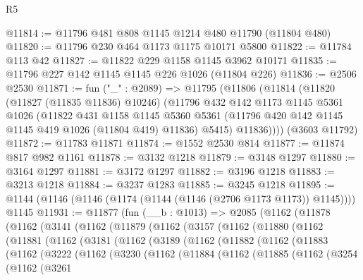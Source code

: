 \begin{lexlean}{R5}
\begin{coremodule}
@11814 := @11796 @481 @808 @1145 @1214 @480 @11790 (@11804 @480)
@11820 := @11796 @230 @464 @1173 @1175 @10171 @5800
@11822 := @11784 @113 @42
@11827 := @11822 @229 @1158 @1145 @3962 @10171
@11835 := @11796 @227 @142 @1145 @1145 @226 @1026 (@11804 @226)
@11836 := @2506 @2530
@11871 := fun ("_" : @2089) =>
  @11795
    (@11806
      (@11814
        (@11820
          (@11827 (@11835 @11836) @10246)
          (@11796
            @432
            @142
            @1173
            @1145
            @5361
            @1026
            (@11822
              @431
              @1158
              @1145
              @5360
              @5361
              (@11796 @420 @142 @1145 @1145 @419 @1026 (@11804 @419) @11836)
              @5415)
            @11836))))
    (@3603 @11792)
@11872 := @11783 @11871
@11874 := @1552 @2530 @814
@11877 := @11874 @817 @982 @1161
@11878 := @3132 @1218
@11879 := @3148 @1297
@11880 := @3164 @1297
@11881 := @3172 @1297
@11882 := @3196 @1218
@11883 := @3213 @1218
@11884 := @3237 @1283
@11885 := @3245 @1218
@11895 := @1144 (@1146 (@1146 (@1174 (@1144 (@1146 (@2706 @1173 @1173)) @1145)))) @1145
@11931 := @11877
    (fun (__b : @1013) =>
    @2085
      (@1162
        (@11878
          (@1162
            (@3141
              (@1162
                (@11879
                  (@1162
                    (@3157
                      (@1162
                        (@11880
                          (@1162
                            (@11881
                              (@1162
                                (@3181
                                  (@1162
                                    (@3189
                                      (@1162
                                        (@11882
                                          (@1162
                                            (@11883
                                              (@1162
                                                (@3222
                                                  (@1162
                                                    (@3230
                                                      (@1162
                                                        (@11884
                                                          (@1162
                                                            (@11885
                                                              (@1162
                                                                (@3254
                                                                  (@1162
                                                                    (@3261

\end{coremodule}
\end{lexlean}
